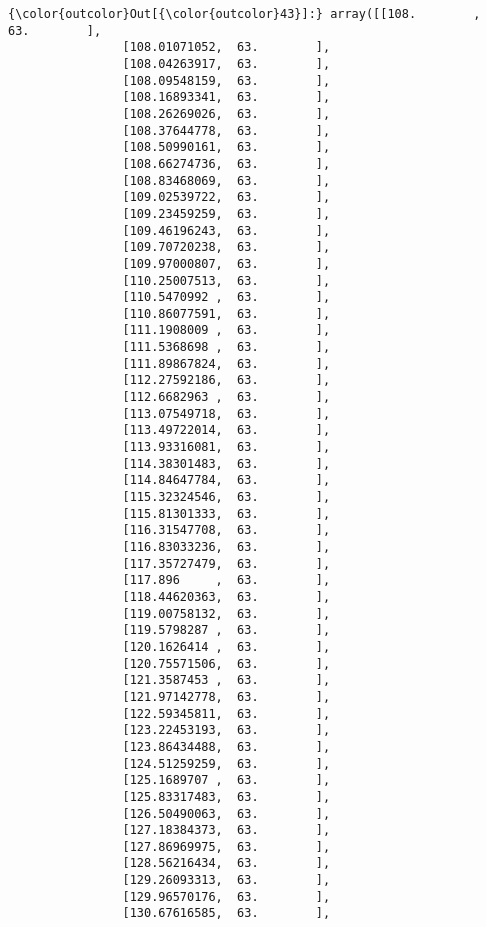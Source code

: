 \documentclass[11pt]{article}
\begin{document}
\begin{Verbatim}[commandchars=\\\{\}]
{\color{outcolor}Out[{\color{outcolor}43}]:} array([[108.        ,  63.        ],
                [108.01071052,  63.        ],
                [108.04263917,  63.        ],
                [108.09548159,  63.        ],
                [108.16893341,  63.        ],
                [108.26269026,  63.        ],
                [108.37644778,  63.        ],
                [108.50990161,  63.        ],
                [108.66274736,  63.        ],
                [108.83468069,  63.        ],
                [109.02539722,  63.        ],
                [109.23459259,  63.        ],
                [109.46196243,  63.        ],
                [109.70720238,  63.        ],
                [109.97000807,  63.        ],
                [110.25007513,  63.        ],
                [110.5470992 ,  63.        ],
                [110.86077591,  63.        ],
                [111.1908009 ,  63.        ],
                [111.5368698 ,  63.        ],
                [111.89867824,  63.        ],
                [112.27592186,  63.        ],
                [112.6682963 ,  63.        ],
                [113.07549718,  63.        ],
                [113.49722014,  63.        ],
                [113.93316081,  63.        ],
                [114.38301483,  63.        ],
                [114.84647784,  63.        ],
                [115.32324546,  63.        ],
                [115.81301333,  63.        ],
                [116.31547708,  63.        ],
                [116.83033236,  63.        ],
                [117.35727479,  63.        ],
                [117.896     ,  63.        ],
                [118.44620363,  63.        ],
                [119.00758132,  63.        ],
                [119.5798287 ,  63.        ],
                [120.1626414 ,  63.        ],
                [120.75571506,  63.        ],
                [121.3587453 ,  63.        ],
                [121.97142778,  63.        ],
                [122.59345811,  63.        ],
                [123.22453193,  63.        ],
                [123.86434488,  63.        ],
                [124.51259259,  63.        ],
                [125.1689707 ,  63.        ],
                [125.83317483,  63.        ],
                [126.50490063,  63.        ],
                [127.18384373,  63.        ],
                [127.86969975,  63.        ],
                [128.56216434,  63.        ],
                [129.26093313,  63.        ],
                [129.96570176,  63.        ],
                [130.67616585,  63.        ],

\end{Verbatim}
\end{document}
